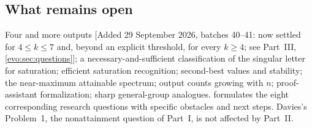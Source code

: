\documentclass[11pt,a4paper]{article}
\numberwithin{equation}{section}
\theoremstyle{definition}
\theoremstyle{remark}
\begin{document}
\subsection{What remains open}

Four and more outputs [Added 29 September 2026, batches 40--41: now settled for $4\le k\le7$ and,
beyond an explicit threshold, for every $k\ge4$; see Part~III,
\cref{evo:sec:questions}]; a necessary-and-sufficient classification of the
singular letter for saturation; efficient saturation recognition; second-best
values and stability; the near-maximum attainable spectrum; output counts
growing with $n$; proof-assistant formalization; sharp general-group
analogues.  formulates the eight corresponding
research questions with specific obstacles and next steps. Davies's
Problem~1, the nonattainment question of Part~I, is not affected by Part~II.
\end{document}

